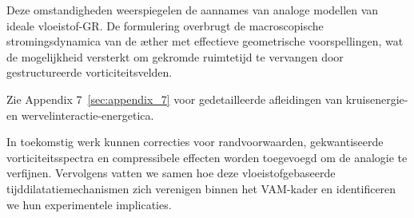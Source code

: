 Deze omstandigheden weerspiegelen de aannames van analoge modellen van ideale vloeistof-GR. De formulering overbrugt de macroscopische stromingsdynamica van de æther met effectieve geometrische voorspellingen, wat de mogelijkheid versterkt om gekromde ruimtetijd te vervangen door gestructureerde vorticiteitsvelden.

Zie Appendix 7~\ref{sec:appendix_7} voor gedetailleerde afleidingen van kruisenergie- en wervelinteractie-energetica.

In toekomstig werk kunnen correcties voor randvoorwaarden, gekwantiseerde vorticiteitsspectra en compressibele effecten worden toegevoegd om de analogie te verfijnen. Vervolgens vatten we samen hoe deze vloeistofgebaseerde tijddilatatiemechanismen zich verenigen binnen het VAM-kader en identificeren we hun experimentele implicaties.